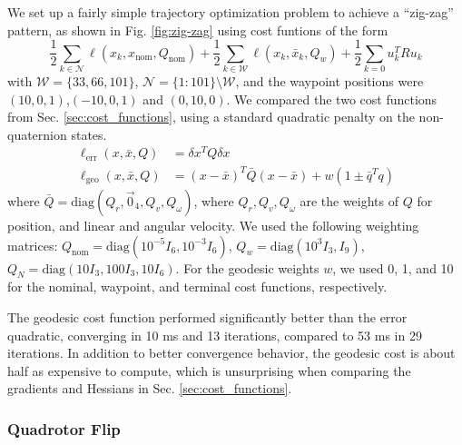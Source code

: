 \documentclass{svproc}
\newcommand{\half}{\frac{1}{2}}
\begin{document}
        We set up a fairly simple trajectory optimization problem to achieve a ``zig-zag'' pattern, as shown in Fig. \ref{fig:zig-zag} using cost funtions of the form 
        \begin{equation}
                  \half \sum_{k \in \mathcal{N}} \ell(x_k, x_\text{nom}, Q_\text{nom}) 
                + \half \sum_{k \in \mathcal{W}} \ell(x_k, \bar{x}_k, Q_w) 
                + \half \sum_{k=0} u_k^T R u_k
        \end{equation}
        with $\mathcal{W} = \{33,66,101\}$, $\mathcal{N} = \{1:101\} \setminus \mathcal{W}$, and the waypoint positions were $(10,0,1)$,$(-10,0,1)$ and $(0,10,0)$. We compared the two cost functions from Sec. \ref{sec:cost_functions}, using a standard quadratic penalty on the non-quaternion states. 
        \begin{align}
            \ell_\text{err}(x, \bar{x}, Q) &= \delta x^T Q \delta x \\ 
            \ell_\text{geo}(x, \bar{x}, Q) &= (x-\bar{x})^T \bar{Q} (x-\bar{x}) + w (1 \pm \bar{q}^T q)
        \end{align}
        where $\bar{Q} = \text{diag}(Q_r, \vec{0}_4, Q_v, Q_\omega)$, where $Q_r,Q_v,Q_\omega$ are the weights of $Q$ for position, and linear and angular velocity.
        We used the following weighting matrices: 
        $Q_\text{nom} = \text{diag}(10^{-5} I_6,10^{-3} I_6)$, 
        $Q_w = \text{diag}(10^3 I_3,I_9)$, 
        $Q_N = \text{diag}(10 I_3, 100 I_3, 10 I_6)$.
        For the geodesic weights $w$, we used 0, 1, and 10 for the nominal, waypoint, and terminal cost functions, respectively. 
        
        
        The geodesic cost function performed significantly better than the error quadratic, converging in 10 ms and 13 iterations, compared to 53 ms in 29 iterations. 
        In addition to better convergence behavior, the geodesic cost is about half as expensive to compute, which is unsurprising when comparing the gradients and Hessians in Sec. \ref{sec:cost_functions}. 
        
        \subsubsection{Quadrotor Flip}
	    
\end{document}
